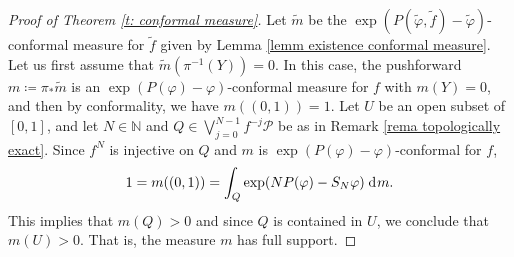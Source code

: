 \documentclass[12pt]{amsart}
\numberwithin{equation}{section} %
\numberwithin{figure}{section} %
\theoremstyle{plain}
\theoremstyle{definition}
\theoremstyle{remark}
\theoremstyle{citing}
\newcommand{\N}{\mathbb{N}}
\renewcommand{\=}{\coloneqq}
\newcommand{\dd}{\hspace{1pt}\operatorname{d}\hspace{-1pt}}
\begin{document}
\begin{proof}[Proof of Theorem \ref{t: conformal measure}]
Let $\widetilde{m}$ be the $\exp(P(\widetilde{\varphi},\widetilde{f})-\widetilde{\varphi})$-conformal measure for $\widetilde{f}$ given by Lemma \ref{lemm existence conformal measure}. Let us first assume that $\widetilde{m}(\pi^{-1}(Y))=0$. In this case, the pushforward $m\= \pi_*\widetilde{m}$ is an $\exp(P(\varphi)-\varphi)$-conformal measure for $f$ with $m(Y)=0$, and then by conformality, we have $m((0,1))=1$. Let $U$ be an open subset of $[0,1]$, and let $N\in \N$ and $Q\in  \bigvee_{j=0}^{N-1}f^{-j}\mathcal{P}$ be as in Remark \ref{rema topologically exact}. Since $f^N$ is injective on $Q$ and $m$ is $\exp(P(\varphi)-\varphi)$-conformal for $f$,
\begin{equation*}
    1=m((0,1))= \int_{Q} \exp(NP(\varphi)-S_N\varphi) \dd m.
\end{equation*}
This implies that $m(Q)>0$ and since $Q$ is contained in $U$, we conclude that $m(U)>0$. That is, the measure $m$ has full support.


\end{proof}
\end{document}

